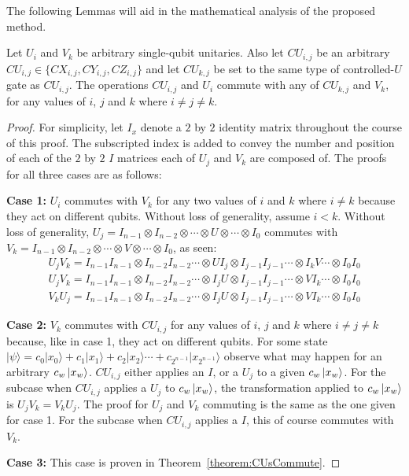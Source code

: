 The following Lemmas will aid in the mathematical analysis of the proposed method. 
\begin{myLemmarep}
\label{lemma:commutingEncryptionOperators}
Let $U_i$ and $V_k$ be arbitrary single-qubit unitaries. Also let $\mathit{CU}_{i,j}$ be an arbitrary $\mathit{CU}_{i,j} \in \{\mathit{CX}_{i,j}, \mathit{CY}_{i,j}, \mathit{CZ}_{i,j}\}$ and let $\mathit{CU}_{k,j}$ be set to the same type of controlled-$U$ gate as $\mathit{CU}_{i,j}$. The operations $\mathit{CU}_{i,j}$ and $U_i$ commute with any of $\mathit{CU}_{k,j}$ and $V_k$, for any values of $i$, $j$ and $k$ where $i \neq j \neq k$.
\end{myLemmarep}
\begin{proof}
For simplicity, let $I_x$ denote a $2$ by $2$ identity matrix throughout the course of this proof. The subscripted index is added to convey the number and position of each of the $2$ by $2$ $I$ matrices each of $U_j$ and $V_k$ are composed of. The proofs for all three cases are as follows:

\textbf{Case 1:} $U_i$ commutes with $V_k$ for any two values of $i$ and $k$ where $i \neq k$ because they act on different qubits. Without loss of generality, assume $i < k$. Without loss of generality, $U_j = I_{n-1} \otimes I_{n-2} \otimes \cdots \otimes U \otimes \cdots \otimes I_0$ commutes with $V_k = I_{n-1} \otimes I_{n-2} \otimes \cdots \otimes V \otimes \cdots \otimes I_0$, as seen:
\begin{align}
U_jV_k = I_{n-1}I_{n-1} \otimes I_{n-2}I_{n-2} \cdots \otimes UI_j \otimes I_{j-1}I_{j-1} \cdots \otimes I_kV \cdots \otimes I_0I_0\\
U_jV_k = I_{n-1}I_{n-1} \otimes I_{n-2}I_{n-2} \cdots \otimes I_jU \otimes I_{j-1}I_{j-1} \cdots \otimes VI_k \cdots \otimes I_0I_0\\
V_kU_j = I_{n-1}I_{n-1} \otimes I_{n-2}I_{n-2} \cdots \otimes I_jU \otimes I_{j-1}I_{j-1} \cdots \otimes VI_k \cdots \otimes I_0I_0
\end{align}

\textbf{Case 2:} $V_k$ commutes with $\mathit{CU}_{i,j}$ for any values of $i$, $j$ and $k$ where $i \neq j \neq k$ because, like in case 1, they act on different qubits. For some state $|\psi\rangle = c_0|x_0\rangle + c_1|x_1\rangle + c_2|x_2\rangle \cdots + c_{2^{n-1}}|x_{2^{n-1}}\rangle$ observe what may happen for an arbitrary $c_w\ket{x_w}$. $\mathit{CU}_{i,j}$ either applies an $I$, or a $U_j$ to a given $c_w\ket{x_w}$. For the subcase when $\mathit{CU}_{i,j}$ applies a $U_j$ to $c_w\ket{x_w}$, the transformation applied to $c_w\ket{x_w}$ is $U_jV_k = V_kU_j$. The proof for $U_j$ and $V_k$ commuting is the same as the one given for case 1. For the subcase when $\mathit{CU}_{i,j}$ applies a $I$, this of course commutes with $V_k$.

\textbf{Case 3:} This case is proven in Theorem~\ref{theorem:CUsCommute}.
\end{proof}

